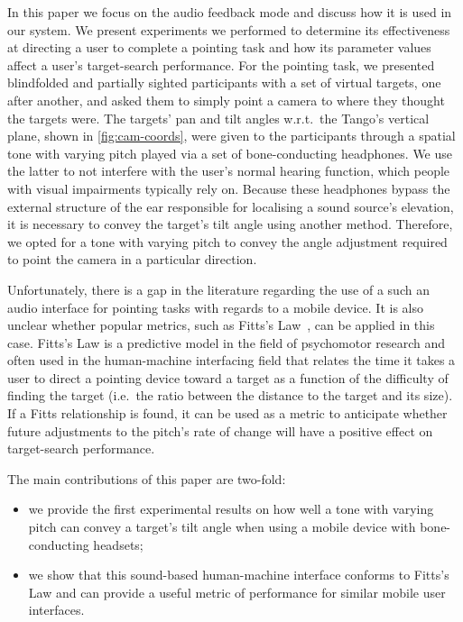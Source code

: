 \documentclass[sigconf, review=true, screen=true, anonymous=true]{acmart}
\begin{document}
In this paper we focus on the audio feedback mode and discuss how it is used in our system.
We present experiments we performed to determine its effectiveness at directing a user to complete a pointing task and how its parameter values affect a user's target-search performance.
For the pointing task, we presented blindfolded and partially sighted participants with a set of virtual targets, one after another, and asked them to simply point a camera to where they thought the targets were.
The targets' pan and tilt angles w.r.t.\ the Tango's vertical plane, shown in \cref{fig:cam-coords}, were given to the participants through a spatial tone with varying pitch played via a set of bone-conducting headphones.
We use the latter to not interfere with the user's normal hearing function, which people with visual impairments typically rely on.
Because these headphones bypass the external structure of the ear responsible for localising a sound source's elevation, it is necessary to convey the target's tilt angle using another method.
Therefore, we opted for a tone with varying pitch to convey the angle adjustment required to point the camera in a particular direction.

Unfortunately, there is a gap in the literature regarding the use of a such an audio interface for pointing tasks with regards to a mobile device.
It is also unclear whether popular metrics, such as Fitts's Law~\cite{fitts1954information}, can be applied in this case.
Fitts's Law is a predictive model in the field of psychomotor research and often used in the human-machine interfacing field that relates the time it takes a user to direct a pointing device toward a target as a function of the difficulty of finding the target (i.e.\ the ratio between the distance to the target and its size).
If a Fitts relationship is found, it can be used as a metric to anticipate whether future adjustments to the pitch's rate of change will have a positive effect on target-search performance.

The main contributions of this paper are two-fold: 

\begin{itemize}
  \item we provide the first experimental results on how well a tone with varying pitch can convey a target's tilt angle when using a mobile device with bone-conducting headsets; 
  \item we show that this sound-based human-machine interface conforms to Fitts's Law and can provide a useful metric of performance for similar mobile user interfaces.
\end{itemize}
\end{document}
